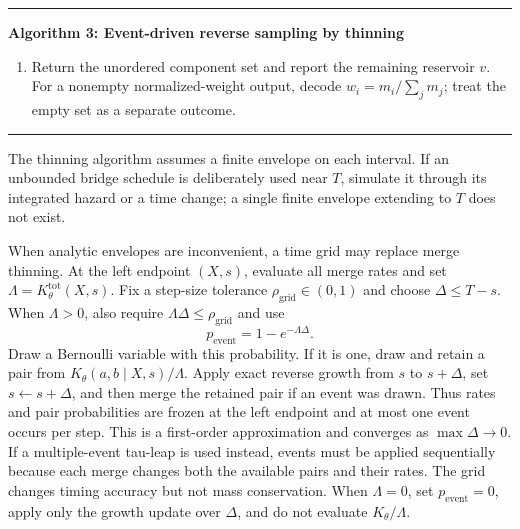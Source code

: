 \documentclass[10pt]{article}
\theoremstyle{definition}
\theoremstyle{remark}
\newcommand{\mergemap}{\mathcal{C}}
\newenvironment{algorithmblock}[1]
{\par\medskip\noindent\begin{minipage}{\linewidth}\hrule\medskip
 \noindent\textbf{#1}\par\smallskip\small}
{\par\medskip\hrule\end{minipage}\par\medskip}
\begin{document}
\begin{algorithmblock}{Algorithm 3: Event-driven reverse sampling by thinning}
\begin{enumerate}
\begin{enumerate}
    return to the coagulation-stage test, and stop only when $s_I=T$.
    \item Draw $E_K\sim\operatorname{Exp}(\overline K)$.  If
    $s+E_K\geq s_I$,
    flow to $s_I$, set $s\leftarrow s_I$, and return to the coagulation-stage
    test.  Otherwise flow to $s+E_K$ and set $s\leftarrow s+E_K$.
    \item Accept with probability
    $\Lambda_\theta^C(X,s)/\overline K$.  On acceptance, sample an unordered
    pair from $\pi_\theta(a,b\mid X,s)$ and apply
    $X\leftarrow\mergemap_{ab}(X)$.  Whether accepted or rejected, recompute
    or revalidate the next envelope and repeat the coagulation-stage test.
  \end{enumerate}
  \item Return the unordered component set and report the remaining
  reservoir $v$.  For a nonempty normalized-weight output, decode
  $w_i=m_i/\sum_jm_j$; treat the empty set as a separate outcome.
\end{enumerate}
\end{algorithmblock}

The thinning algorithm assumes a finite envelope on each interval.  If an
unbounded bridge schedule is deliberately used near $T$, simulate it through
its integrated hazard or a time change; a single finite envelope extending
to $T$ does not exist.

When analytic envelopes are inconvenient, a time grid may replace merge
thinning.  At the left endpoint $(X,s)$, evaluate all merge rates and set
$\Lambda=K_\theta^{\mathrm{tot}}(X,s)$.  Fix a step-size tolerance
$\rho_{\mathrm{grid}}\in(0,1)$ and choose $\Delta\leq T-s$.  When
$\Lambda>0$, also require
$\Lambda\Delta\leq\rho_{\mathrm{grid}}$ and use
\begin{equation}
  p_{\mathrm{event}}=1-e^{-\Lambda\Delta}.
  \label{eq:grid-event-probability}
\end{equation}
Draw a Bernoulli variable with this probability.  If it is one, draw and
retain a pair from $K_\theta(a,b\mid X,s)/\Lambda$.  Apply exact reverse
growth from $s$ to $s+\Delta$, set $s\leftarrow s+\Delta$, and then merge the
retained pair if an event was drawn.  Thus rates and pair probabilities are
frozen at the left endpoint and at most one event occurs per step.  This is a
first-order approximation and converges as $\max\Delta\to0$.  If a
multiple-event tau-leap is used instead, events must be applied sequentially
because each merge changes both the available pairs and their rates.  The
grid changes timing accuracy but not mass conservation.  When $\Lambda=0$,
set $p_{\mathrm{event}}=0$, apply only the growth update over $\Delta$, and
do not evaluate $K_\theta/\Lambda$.
\end{document}
